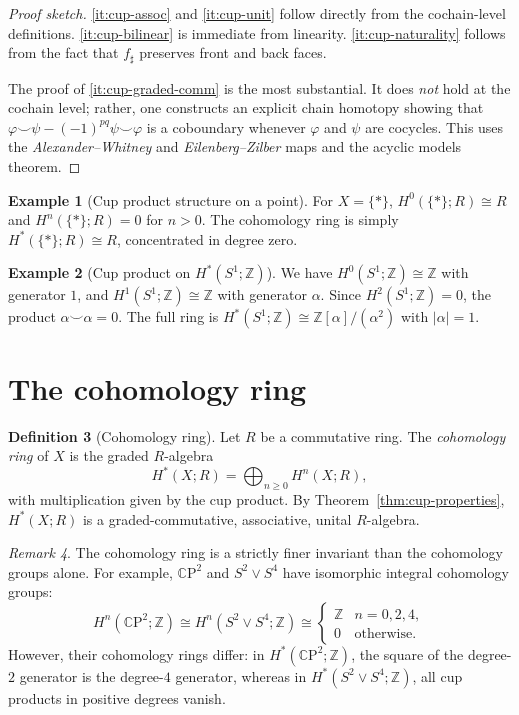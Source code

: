 \documentclass[12pt,a4paper,openany]{book}
\theoremstyle{definition}
\newtheorem{definition}{Definition}[chapter]
\newtheorem{example}[definition]{Example}
\theoremstyle{plain}
\theoremstyle{remark}
\newtheorem{remark}[definition]{Remark}
\newcommand{\Z}{\mathbb{Z}}
\newcommand{\CP}{\mathbb{C}\mathrm{P}}
\newcommand{\abs}[1]{\left|#1\right|}
\begin{document}
\begin{proof}[Proof sketch]
\ref{it:cup-assoc} and \ref{it:cup-unit} follow directly from the
cochain-level definitions. \ref{it:cup-bilinear} is immediate from
linearity. \ref{it:cup-naturality} follows from the fact that
$f_\sharp$ preserves front and back faces.

The proof of \ref{it:cup-graded-comm} is the most substantial.
It does \emph{not} hold at the cochain level; rather, one constructs
an explicit chain homotopy showing that
$\varphi\smile\psi - (-1)^{pq}\psi\smile\varphi$ is a coboundary
whenever $\varphi$ and $\psi$ are cocycles. This uses the
\emph{Alexander--Whitney} and \emph{Eilenberg--Zilber} maps and the
acyclic models theorem.
\end{proof}

\begin{example}[Cup product structure on a point]
For $X=\{*\}$, $H^0(\{*\};R)\cong R$ and $H^n(\{*\};R)=0$ for $n>0$.
The cohomology ring is simply $H^*(\{*\};R)\cong R$, concentrated in
degree zero.
\end{example}

\begin{example}[Cup product on $H^*(S^1;\Z)$]
We have $H^0(S^1;\Z)\cong\Z$ with generator $1$, and
$H^1(S^1;\Z)\cong\Z$ with generator $\alpha$. Since
$H^2(S^1;\Z)=0$, the product $\alpha\smile\alpha=0$.
The full ring is $H^*(S^1;\Z)\cong\Z[\alpha]/(\alpha^2)$ with
$\abs{\alpha}=1$.
\end{example}

\section{The cohomology ring}
\label{sec:cohomology-ring}

\begin{definition}[Cohomology ring]
Let $R$ be a commutative ring. The \emph{cohomology ring} of $X$ is
the graded $R$-algebra
\[
  H^*(X;R) = \bigoplus_{n\geq 0} H^n(X;R),
\]
with multiplication given by the cup product. By
Theorem~\ref{thm:cup-properties}, $H^*(X;R)$ is a graded-commutative,
associative, unital $R$-algebra.
\end{definition}

\begin{remark}
The cohomology ring is a strictly finer invariant than the cohomology
groups alone. For example, $\CP^2$ and $S^2\vee S^4$ have isomorphic
integral cohomology groups:
\[
  H^n(\CP^2;\Z)\cong H^n(S^2\vee S^4;\Z)
  \cong
  \begin{cases}
    \Z & n=0,2,4,\\
    0  & \text{otherwise.}
  \end{cases}
\]
However, their cohomology rings differ: in $H^*(\CP^2;\Z)$, the
square of the degree-$2$ generator is the degree-$4$ generator, whereas
in $H^*(S^2\vee S^4;\Z)$, all cup products in positive degrees vanish.
\end{remark}
\end{document}
